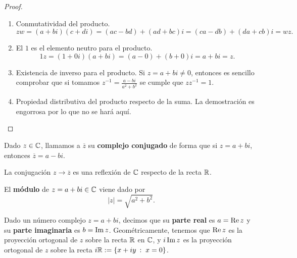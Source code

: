 \begin{proof}
\begin{enumerate}
\[\begin{split}
	\end{split}
	\]
\item Conmutatividad del producto.
	\[zw = \left(a + bi\right)\left(c + di\right)=\left(ac - bd\right) + \left(ad + bc\right)i = \left(ca - db\right)+\left(da + cb\right)i = wz .\]
\item El $\displaystyle 1 $ es el elemento neutro para el producto.
	\[1z = \left(1 + 0i\right)\left(a + bi\right)=\left(a - 0\right) + \left(b + 0\right)i = a + bi = z .\]
\item Existencia de inverso para el producto. Si $\displaystyle z = a + bi \neq 0 $, entonces es sencillo comprobar que si tomamos $\displaystyle z^{-1}=\frac{a -bi}{a^{2}+b^{2}} $ se cumple que $\displaystyle zz^{-1}= 1 $.
\item Propiedad distributiva del producto respecto de la suma. La demostración es engorrosa por lo que no se hará aquí.
\end{enumerate}
\end{proof}
 
\begin{definition}
Dado $\displaystyle z \in \mathbb{C} $, llamamos a $\displaystyle \overline{z} $ su \textbf{complejo conjugado} de forma que si $\displaystyle z = a + bi $, entonces $\displaystyle \overline{z}= a-bi $. 
\end{definition}
\begin{observation}
La conjugación $\displaystyle z \to \overline{z} $ es una reflexión de $\displaystyle \mathbb{C} $ respecto de la recta $\displaystyle \mathbb{R} $. 
\end{observation}
\begin{definition}[Módulo]
El \textbf{módulo} de $\displaystyle z = a + bi \in \mathbb{C} $ viene dado por
\[ \left|z\right|=\sqrt{a^{2}+b^{2}} .\]
\end{definition}

\begin{notation}
	Dado un número complejo $\displaystyle z = a + bi $, decimos que su \textbf{parte real} es $\displaystyle a = \operatorname{Re} z $ y su \textbf{parte imaginaria} es $\displaystyle b = \operatorname{Im} z $. Geométricamente, tenemos que $\displaystyle \operatorname{Re} z $ es la proyección ortogonal de $\displaystyle z $ sobre la recta $\displaystyle \mathbb{R} $ en $\displaystyle \mathbb{C} $, y $\displaystyle i \operatorname{Im} z $ es la proyección ortogonal de $\displaystyle z $ sobre la recta $\displaystyle i\mathbb{R} := \left\{ x + iy \: : \; x = 0\right\}  $.
\end{notation}

